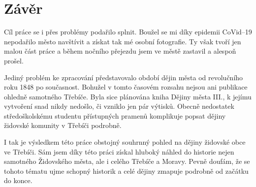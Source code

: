 \chapter*{Závěr}

Cíl práce se i přes problémy podařilo splnit.
Boužel se mi díky epidemii CoVid--19 nepodařilo město navštívit a získat tak mé osobní fotografie.
Ty však tvoří jen malou část práce a během nočního přejezdu jsem ve městě zastavil a alespoň prošel.

Jediný problém ke zpracování představovalo období dějin města od revolučního roku 1848 po současnost.
Bohužel v tomto časovém rozsahu nejsou ani publikace ohledně samotného Třebíče.
Byla sice plánována kniha Dějiny města III., k jejímu vytvoření snad nikdy nedošlo, či vzniklo jen pár výtisků.
Obecně nedostatek středoškolskému studentu přístupných pramenů komplikuje popsat dějiny židovské komunity v Třebíči podrobně.

I tak je výsledkem této práce obstojný souhrnný pohled na dějiny židovské obce ve Třebíči.
Sám jsem díky této práci získal hluboký náhled do historie nejen samotného Židovského města, ale i celého Třebíče a Moravy.
Pevně doufám, že se tohoto tématu ujme schopný historik a celé dějiny zmapuje podrobně od začátku do konce.
